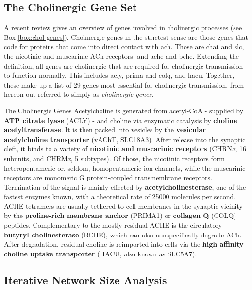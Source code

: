 \subsection{The Cholinergic Gene Set}
A recent review gives an overview of genes involved in cholinergic processes\cite{Soreq2015} (see Box \ref{box:chol-genes}). Cholinergic genes in the strictest sense are those genes that code for proteins that come into direct contact with \acf{ach}. Those are \ac{chat} and \ac{slc}, the nicotinic and muscarinic ACh-receptors, and \acs{ache} and \acs{bche}. Extending the definition, all genes are cholinergic that are required for cholinergic transmission to function normally. This includes \acs{acly}, \acs{prima} and \acs{colq}, and \acs{hacu}. Together, these make up a list of 29 genes most essential for cholinergic transmission, from hereon out referred to simply as \emph{cholinergic genes}.

\begin{mybox}{The Cholinergic Genes}\label{box:chol-genes}
Acetylcholine is generated from acetyl-CoA - supplied by \textbf{ATP citrate lyase} (ACLY) - and choline via enzymatic catalysis by \textbf{choline acetyltransferase}. It is then packed into vesicles by the \textbf{vesicular acetylcholine transporter} (vAChT, SLC18A3). After release into the synaptic cleft, it binds to a variety of \textbf{nicotinic and muscarinic receptors} (CHRN\emph{x}, 16 subunits, and CHRM\emph{x}, 5 subtypes). Of those, the nicotinic receptors form heteropentameric or, seldom, homopentameric ion channels, while the muscarinic receptors are monomeric G protein-coupled transmembrane receptors. Termination of the signal is mainly effected by \textbf{acetylcholinesterase}, one of the fastest enzymes known, with a theoretical rate of \num{25000} molecules per second. ACHE tetramers are usually tethered to cell membranes in the synaptic vicinity by the \textbf{proline-rich membrane anchor} (PRIMA1) or \textbf{collagen Q} (COLQ) peptides. Complementary to the mostly residual ACHE is the circulatory \textbf{butyryl cholinesterase} (BCHE), which can also nonspecifically degrade ACh. After degradation, residual choline is reimported into cells via the \textbf{high affinity choline uptake transporter} (HACU, also known as SLC5A7).
\end{mybox}

\subsection{Iterative Network Size Analysis}

 


